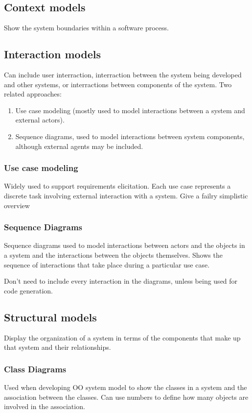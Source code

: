 \documentclass{article}
\begin{document}
\subsection{Context models}
Show the system boundaries within a software process.

\subsection{Interaction models}
Can include user interraction, interraction between the system being developed and other systems, or interractions between components of the system.  Two related approaches:
\begin{enumerate}
    \item Use case modeling (mostly used to model interactions between a system and external actors).
    \item Sequence diagrams, used to model interactions between system components, although external agents may be included.
\end{enumerate}

\subsubsection{Use case modeling}
Widely used to support requirements elicitation.
Each use case represents a discrete task involving external interaction with a system.
Give a failry simplistic overview

\subsubsection{Sequence Diagrams}
Sequence diagrams used to model interactions between actors and the objects in a system and the interactions between the objects themselves.
Shows the sequence of interactions that take place during a particular use case.

Don't need to include every interaction in the diagrams, unless being used for code generation.

\subsection{Structural models}
Display the organization of a system in terms of the components that make up that system and their relationships.

\subsubsection{Class Diagrams}
Used when developing OO system model to show the classes in a system and the association between the classes.
Can use numbers to define how many objects are involved in the association.
\end{document}
